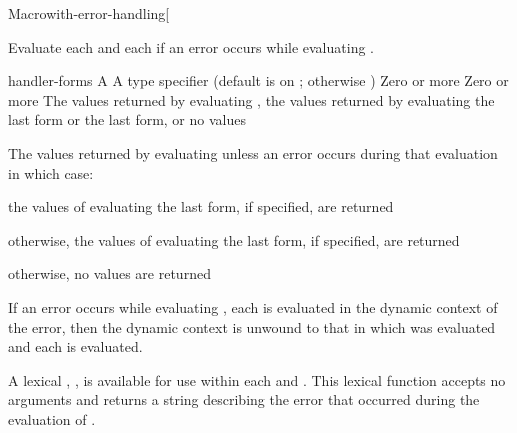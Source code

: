 \documentclass[10pt,twoside,english,pdftex]{article}
\begin{document}
\begin{functiondoc}{Macro}{with-error-handling}{[ \vbar{}
    \code{(} 
       \superstar{}\code{)}
    \superstar{} 
    \returns{} \superstar} 
%
%
%  
%  
\fnsyntax

\fnpurpose Evaluate each  and each
 if an error occurs while evaluating .

\fnpackage {}

\fnmodule {}

\fnargs
\begin{args}{handler-forms}
\arg[form] A 
\arg[type] A type specifier (default is  on ; 
  otherwise )
 Zero or more 
 Zero or more 
\arg[results] The values returned by evaluating , the values
  returned by evaluating the last  form or the last 
   form, or no values
\end{args}

\fnreturns The values returned by evaluating  unless an
error occurs during that evaluation in which case:
\begin{tightitemize}
\item the values of evaluating the last  form, if
  specified, are returned
\item otherwise, the values of evaluating the last 
  form, if specified, are returned
\item otherwise, no values are returned
\end{tightitemize}

\fndescription If an error occurs while evaluating , each
 is evaluated in the dynamic context of the error,
then the dynamic context is unwound to that in which  was
evaluated and each  is evaluated.

A lexical , , is available for
use within each  and .  This
lexical function accepts no arguments and returns a string describing the
error that occurred during the evaluation of .


\end{functiondoc}
\end{document}
